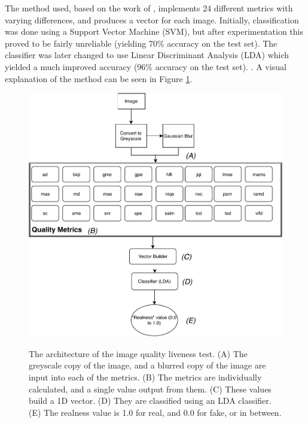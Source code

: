 \documentclass[10pt,a4paper]{article}
\begin{document}
        The method used, based on the work of \citet{ImageQualityAssessmentTest}, implements 24 different metrics with varying differences, and produces
        a vector for each image. Initially, classification was done using a Support Vector Machine (SVM), but after experimentation this proved to be fairly
        unreliable (yielding 70\% accuracy on the test set). The classifier was later changed to use Linear Discriminant Analysis (LDA) which yielded a much improved
        accuracy (96\% accuracy on the test set). .
        A visual explanation of the method can be seen in Figure \ref{ImageQualityLivenessTestDiagram}. 


        \begin{figure}
            \centering
            \includegraphics[width=\linewidth]{ImageQualityLivenessTest.pdf}
            \label{ImageQualityLivenessTestDiagram}
            \caption{The architecture of the image quality liveness test. (A) The greyscale copy of the image, and a blurred copy of the image are input into each of the metrics.
            (B) The metrics are individually calculated, and a single value output from them. (C) These values build a 1D vector. (D) They are classified using an LDA classifier. (E) The realness value
            is 1.0 for real, and 0.0 for fake, or in between.}
        \end{figure}
\end{document}
